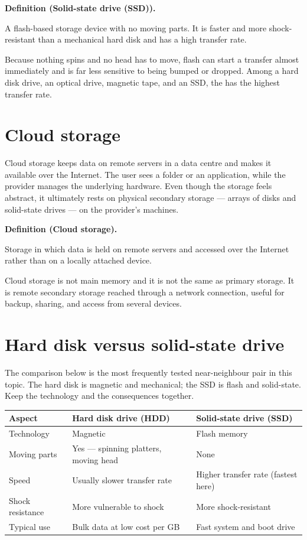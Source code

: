 \documentclass[11pt]{article}
\newenvironment{definitionbox}[1]{%
  \par\noindent\textbf{Definition (#1).}\ \itshape
}{\par\vspace{0.3em}}
\begin{document}
\begin{definitionbox}{Solid-state drive (SSD)}
A flash-based storage device with no moving parts. It is faster and more
shock-resistant than a mechanical hard disk and has a high transfer rate.
\end{definitionbox}

Because nothing spins and no head has to move, flash can start a transfer
almost immediately and is far less sensitive to being bumped or dropped.
Among a hard disk drive, an optical drive, magnetic tape, and an SSD, the
 has the highest transfer rate.

\section{Cloud storage}
Cloud storage keeps data on remote servers in a data centre and makes it
available over the Internet. The user sees a folder or an application, while
the provider manages the underlying hardware. Even though the storage feels
abstract, it ultimately rests on physical secondary storage --- arrays of
disks and solid-state drives --- on the provider's machines.

\begin{definitionbox}{Cloud storage}
Storage in which data is held on remote servers and accessed over the
Internet rather than on a locally attached device.
\end{definitionbox}

Cloud storage is not main memory and it is not the same as primary storage.
It is remote secondary storage reached through a network connection, useful
for backup, sharing, and access from several devices.

\section{Hard disk versus solid-state drive}
The comparison below is the most frequently tested near-neighbour pair in this
topic. The hard disk is magnetic and mechanical; the SSD is flash and
solid-state. Keep the technology and the consequences together.

\begin{center}
\begin{tabular}{p{}p{}p{}}
\toprule
\textbf{Aspect} & \textbf{Hard disk drive (HDD)} & \textbf{Solid-state drive (SSD)}\\
\midrule
Technology & Magnetic & Flash memory\\
Moving parts & Yes --- spinning platters, moving head & None\\
Speed & Usually slower transfer rate & Higher transfer rate (fastest here)\\
Shock resistance & More vulnerable to shock & More shock-resistant\\
Typical use & Bulk data at low cost per GB & Fast system and boot drive\\
\bottomrule
\end{tabular}
\end{center}
\end{document}
